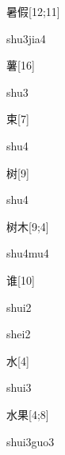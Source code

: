 \begin{verbete}{暑假}[12;11]
\begin{pronuncia}{shu3jia4}
\end{pronuncia}
\end{verbete}

\begin{verbete}[shu3]{薯}[16]
\begin{pronuncia}{shu3}
\end{pronuncia}
\end{verbete}

\begin{verbete}[shu4]{束}[7]
\begin{pronuncia}{shu4}
\end{pronuncia}
\end{verbete}

\begin{verbete}[shu4]{树}[9]
\begin{pronuncia}{shu4}
\end{pronuncia}
\end{verbete}

\begin{verbete}[shu4mu4]{树木}[9;4]
\begin{pronuncia}{shu4mu4}
\end{pronuncia}
\end{verbete}

\begin{verbete}[shui2]{谁}[10]
\begin{pronuncia}{shui2}
\end{pronuncia}
\begin{pronuncia}{shei2}
\end{pronuncia}
\end{verbete}

\begin{verbete}[shui3]{水}[4]
\begin{pronuncia}{shui3}
\end{pronuncia}
\end{verbete}

\begin{verbete}{水果}[4;8]
\begin{pronuncia}{shui3guo3}
\end{pronuncia}
\end{verbete}

